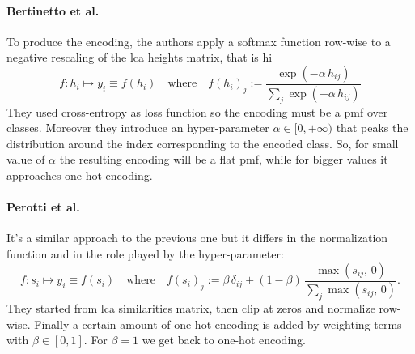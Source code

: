 \paragraph{Bertinetto et al.~\cite{MakingBetterMBertin2019}}
To produce the encoding, the authors apply a softmax function row-wise to a
negative rescaling of the lca heights matrix, that is hi
\begin{equation}
  f : h_i \mapsto y_i \equiv f(h_i)
  \quad \textrm{where} \quad
  f (h_i)_j := \frac{\exp \left({-\alpha \, h_{ij}}\right)}
  {\sum_j \exp\left({-\alpha \, h_{ij}}\right)}
  \label{eq:mbm-hierarchical-encoding}
\end{equation}
They used cross-entropy as loss function so the encoding must be a
\acrshort{pmf} over classes. Moreover they introduce an hyper-parameter $\alpha
\in [0, +\infty)$ that peaks the distribution around the index corresponding to
the encoded class. So, for small value of $\alpha$ the resulting encoding will
be a flat \acrshort{pmf}, while for bigger values it approaches one-hot
encoding.

\paragraph{Perotti et al.~\cite{BeyondOneHotPerott2023}} It's a similar
approach to the previous one but it differs in the normalization function and
in the role played by the hyper-parameter:
\begin{equation}
  f :  s_i \mapsto y_i \equiv f(s_i)
  \quad \textrm{where} \quad
  f (s_i)_j := \beta \, \delta_{ij} +
  \left(1 - \beta \right) \, \frac{\max \left(s_{ij},\,0\right)}
  {\sum_j \max \left(s_{ij},\,0\right)}.
  \label{eq:b3p-hierarchical-encoding}
\end{equation}
They started from \acrshort{lca} similarities matrix, then clip at zeros and
normalize row-wise. Finally a certain amount of one-hot encoding is added by
weighting terms with $\beta \in [0, 1]$. For $\beta = 1$ we get back to one-hot
encoding.

